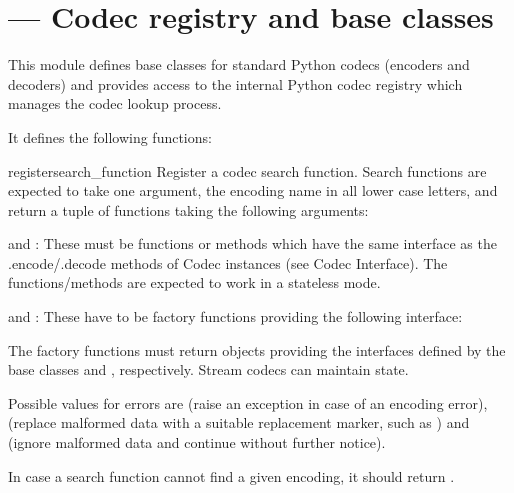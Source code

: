 \section{ ---
         Codec registry and base classes}





This module defines base classes for standard Python codecs (encoders
and decoders) and provides access to the internal Python codec
registry which manages the codec lookup process.

It defines the following functions:

\begin{funcdesc}{register}{search_function}
Register a codec search function. Search functions are expected to
take one argument, the encoding name in all lower case letters, and
return a tuple of functions  taking the following arguments:

   and : These must be functions or methods
  which have the same interface as the .encode/.decode methods of
  Codec instances (see Codec Interface). The functions/methods are
  expected to work in a stateless mode.

   and : These have to be
  factory functions providing the following interface:


  The factory functions must return objects providing the interfaces
  defined by the base classes  and
  , respectively. Stream codecs can maintain
  state.

  Possible values for errors are  (raise an exception
  in case of an encoding error),  (replace malformed
  data with a suitable replacement marker, such as ) and
   (ignore malformed data and continue without further
  notice).

In case a search function cannot find a given encoding, it should
return .
\end{funcdesc}

